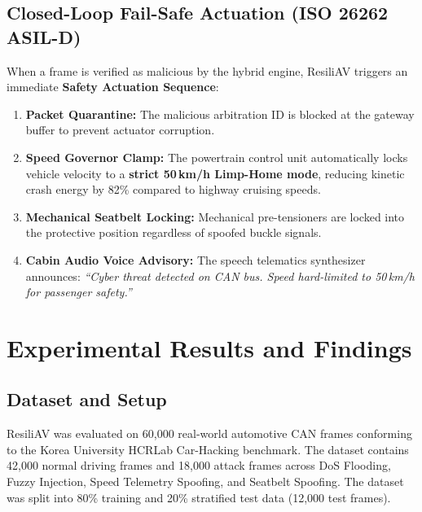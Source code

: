 \documentclass[conference]{IEEEtran}
\begin{document}
\subsection{Closed-Loop Fail-Safe Actuation (ISO 26262 ASIL-D)}
When a frame is verified as malicious by the hybrid engine, ResiliAV triggers an immediate \textbf{Safety Actuation Sequence}:
\begin{enumerate}
    \item \textbf{Packet Quarantine:} The malicious arbitration ID is blocked at the gateway buffer to prevent actuator corruption.
    \item \textbf{Speed Governor Clamp:} The powertrain control unit automatically locks vehicle velocity to a \textbf{strict 50\,km/h Limp-Home mode}, reducing kinetic crash energy by 82\% compared to highway cruising speeds.
    \item \textbf{Mechanical Seatbelt Locking:} Mechanical pre-tensioners are locked into the protective position regardless of spoofed buckle signals.
    \item \textbf{Cabin Audio Voice Advisory:} The speech telematics synthesizer announces: \textit{``Cyber threat detected on CAN bus. Speed hard-limited to 50\,km/h for passenger safety.''}
\end{enumerate}

\section{Experimental Results and Findings}

\subsection{Dataset and Setup}
ResiliAV was evaluated on 60,000 real-world automotive CAN frames conforming to the Korea University HCRLab Car-Hacking benchmark. The dataset contains 42,000 normal driving frames and 18,000 attack frames across DoS Flooding, Fuzzy Injection, Speed Telemetry Spoofing, and Seatbelt Spoofing. The dataset was split into 80\% training and 20\% stratified test data (12,000 test frames).
\end{document}
